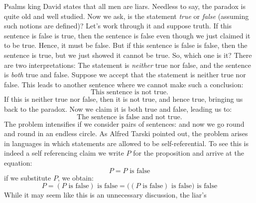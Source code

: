         Psalms king David states that all men are liars. Needless to say, the
        paradox is quite old and well studied. Now we ask, is the statement
        \textit{true} or \textit{false} (assuming such notions are defined)?
        Let's work through it and suppose truth. If this sentence is false is
        true, then the sentence is false even though we just claimed it to be
        true. Hence, it must be false. But if this sentence is false is false,
        then the sentence is true, but we just showed it cannot be true. So,
        which one is it? There are two interpretations: The statement is
        \textit{neither} true nor false, and the sentence is \textit{both} true
        and false. Suppose we accept that the statement is neither true nor
        false. This leads to another sentence where we cannot make such a
        conclusion:
        \begin{equation}
            \text{This sentence is not true.}
        \end{equation}
        If this is neither true nor false, then it is not true, and hence true,
        bringing us back to the paradox. Now we claim it is both true and false,
        leading us to:
        \begin{equation}
            \text{The sentence is false and not true.}
        \end{equation}
        The problem intensifies if we consider pairs of sentences:
        {%
            \label{eqn:That_Statement_Is_False}%
        }
        and now we go round and round in an endless circle. As Alfred Tarski
        pointed out, the problem arises in languages in which statements are
        allowed to be self-referential. To see this is indeed a self
        referencing claim we write $P$ for the proposition and arrive at the
        equation:
        \begin{equation}
            P=P\text{ is false}
        \end{equation}
        if we substitute $P$, we obtain:
        \begin{equation}
            P=(P\text{ is false})\text{ is false}
             =\big((P\text{ is false})\text{ is false}\big)\text{ is false}
        \end{equation}
        While it may seem like this is an unnecessary discussion, the liar's
